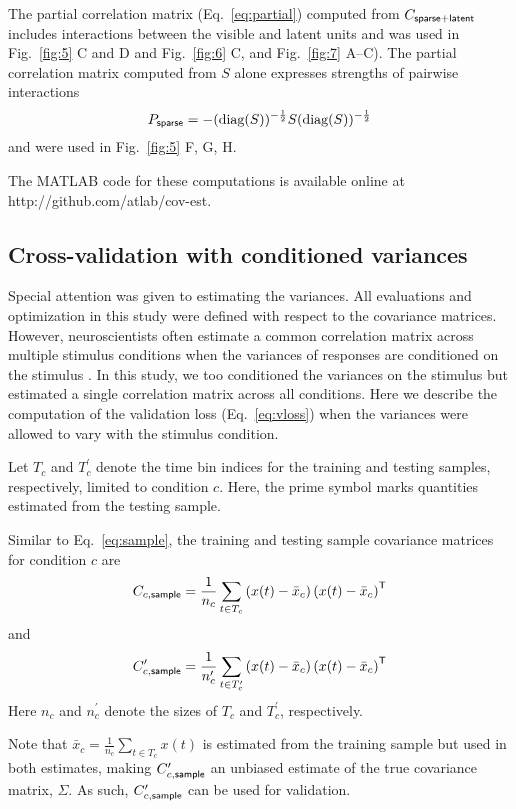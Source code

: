The partial correlation matrix (Eq.~\ref{eq:partial}) computed from $C_{\sf sparse+latent}$ includes interactions between the visible and latent units and was used in Fig.~\ref{fig:5} C and D and Fig.~\ref{fig:6} C, and Fig.~\ref{fig:7} A--C).  The partial correlation matrix computed from $S$ alone expresses strengths of pairwise interactions
\begin{equation}
P_{\sf sparse} = -(\mbox{diag}(S))^{-\frac 1 2} S  (\mbox{diag}(S))^{-\frac 1 2}
\end{equation}
and were used in Fig.~\ref{fig:5} F, G, H.

The MATLAB code for these computations is available online at http://github.com/atlab/cov-est.
\subsection*{Cross-validation with conditioned variances}
Special attention was given to estimating the variances.  
All evaluations and optimization in this study were defined with respect to the covariance matrices.  
However, neuroscientists often estimate a common correlation matrix across multiple stimulus conditions when the variances of responses are conditioned on the stimulus \citep{Vogels:1989, Ponce:2013}. In this study, we too conditioned the variances on the stimulus but estimated a single correlation matrix across all conditions.
Here we describe the computation of the validation loss (Eq.~\ref{eq:vloss}) when the variances were allowed to vary with the stimulus condition.

Let $T_c$ and $T_c^\prime$ denote the time bin indices for the training and testing samples, respectively, limited to condition $c$. Here, the prime symbol marks quantities estimated from the testing sample.

Similar to Eq.~\ref{eq:sample}, the training and testing sample covariance matrices for condition $c$ are
\begin{equation}
    C_{c,{\sf sample}}
    = \frac 1{n_c} \sum\limits_{t\in T_c}\left(x(t)-\bar x_c\right)\left(x(t)-\bar x_c\right)^{\sf T}
\end{equation}
and
\begin{equation}
    C_{c,{\sf sample}}^\prime
    = \frac 1{n_c^\prime} \sum\limits_{t\in T_c^\prime}\left(x(t)-\bar x_c\right)\left(x(t)-\bar x_c\right)^{\sf T}
\end{equation}
Here $n_c$ and $n_c^\prime$ denote the sizes of $T_c$ and $T_c^\prime$, respectively.

Note that $\bar x_c= \frac 1 {n_c} \sum\limits_{t \in T_c}x(t)$ is estimated from the training sample but used in both estimates, making $C_{c,\sf sample}^\prime$ an unbiased estimate of the true covariance matrix, $\Sigma$. As such, $C_{c,\sf sample}^\prime$ can be used for validation.

